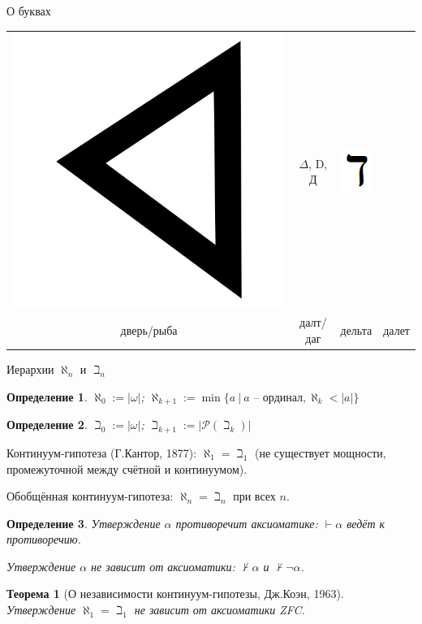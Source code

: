 \documentclass[aspectratio=169]{beamer}
\newtheorem{thm}{Теорема}[section]
\newtheorem{dfn}{Определение}[section]
\begin{document}
\begin{frame}[fragile]{О буквах}
\begin{center}
\begin{tabular}{c|c|c|c}
    \includegraphics[scale=0.01]{pics/lection-14-ph-daleth} &  \Large $\Delta$, D, Д & 
    \includegraphics[scale=0.25]{pics/lection-14-daleth}\\
дверь/рыба & далт/даг & дельта & далет
\end{tabular}
\end{center}
\end{frame}

\begin{frame}{Иерархии $\aleph_n$ и $\beth_n$}
\begin{dfn}$\aleph_0 := |\omega|$; $\aleph_{k+1} := \min\{ a\ |\ a\text{ -- ординал},\aleph_k < |a|\}$\end{dfn}
\begin{dfn}$\beth_0 := |\omega|$; $\beth_{k+1} := |\mathcal{P}(\beth_k)|$\end{dfn}

Континуум-гипотеза (Г.Кантор, 1877): $\aleph_1 = \beth_1$ (не существует мощности, промежуточной 
между счётной и континуумом).

Обобщённая континуум-гипотеза: $\aleph_n = \beth_n$ при всех $n$.

\begin{dfn}Утверждение $\alpha$ противоречит аксиоматике: $\vdash\alpha$ ведёт к противоречию.

Утверждение $\alpha$ не зависит от аксиоматики: $\not\vdash\alpha$ и $\not\vdash\neg\alpha$.\end{dfn}\pause

\begin{thm}[О независимости континуум-гипотезы, Дж.Коэн, 1963] Утверждение $\aleph_1 = \beth_1$
не зависит от аксиоматики ZFC.\end{thm}
\end{frame}
\end{document}
